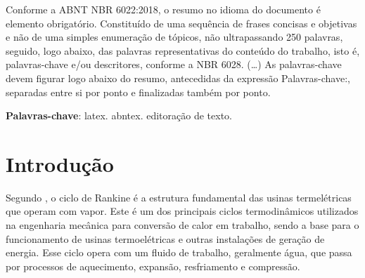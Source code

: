 \documentclass[
	article,			%
	11pt,				%
	oneside,			%
	a4paper,			%
	english,			%
	brazil,				%
	sumario=tradicional
	]{abntex2}
\begin{document}

\frenchspacing


%
%

\maketitle





\begin{resumoumacoluna}
 Conforme a ABNT NBR 6022:2018, o resumo no idioma do documento é elemento obrigatório.
 Constituído de uma sequência de frases concisas e objetivas e não de uma
 simples enumeração de tópicos, não ultrapassando 250 palavras, seguido, logo
 abaixo, das palavras representativas do conteúdo do trabalho, isto é,
 palavras-chave e/ou descritores, conforme a NBR 6028. (\ldots) As
 palavras-chave devem figurar logo abaixo do resumo, antecedidas da expressão
 Palavras-chave:, separadas entre si por ponto e finalizadas também por ponto.

 \vspace{\onelineskip}

 \noindent
 \textbf{Palavras-chave}: latex. abntex. editoração de texto.
\end{resumoumacoluna}

\textual

\section{Introdução}

Segundo \cite{moran-2018}, o ciclo de Rankine é a estrutura fundamental das usinas termelétricas que operam com vapor. Este é um dos principais ciclos termodinâmicos utilizados na engenharia mecânica para conversão de calor em trabalho, sendo a base para o funcionamento de usinas termoelétricas e outras instalações de geração de energia. Esse ciclo opera com um fluido de trabalho, geralmente água, que passa por processos de aquecimento, expansão, resfriamento e compressão.
\end{document}
